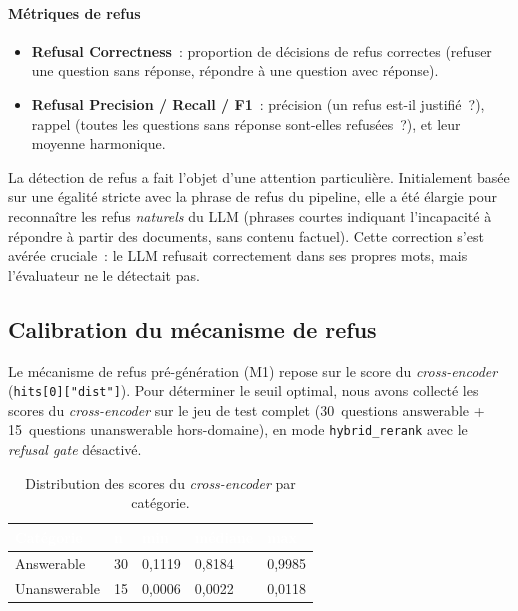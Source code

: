 \documentclass[11pt,a4paper]{article}
\begin{document}
\paragraph{Métriques de refus}

\begin{itemize}
  \item \textbf{Refusal Correctness}~: proportion de décisions de refus correctes (refuser une question sans réponse, répondre à une question avec réponse).
  \item \textbf{Refusal Precision / Recall / F1}~: précision (un refus est-il justifié~?), rappel (toutes les questions sans réponse sont-elles refusées~?), et leur moyenne harmonique.
\end{itemize}

La détection de refus a fait l'objet d'une attention particulière. Initialement basée sur une égalité stricte avec la phrase de refus du pipeline, elle a été élargie pour reconnaître les refus \textit{naturels} du LLM (phrases courtes indiquant l'incapacité à répondre à partir des documents, sans contenu factuel). Cette correction s'est avérée cruciale~: le LLM refusait correctement dans ses propres mots, mais l'évaluateur ne le détectait pas.

\subsection{Calibration du mécanisme de refus}
\label{sec:calibration}

Le mécanisme de refus pré-génération (M1) repose sur le score du \textit{cross-encoder} (\texttt{hits[0]["dist"]}). Pour déterminer le seuil optimal, nous avons collecté les scores du \textit{cross-encoder} sur le jeu de test complet (30~questions answerable + 15~questions unanswerable hors-domaine), en mode \texttt{hybrid\_rerank} avec le \textit{refusal gate} désactivé.

\begin{table}[H]
\centering
\small
\begin{tabularx}{\linewidth}{L{3.5cm} C{1.5cm} C{2cm} C{2cm} C{2cm}}
\toprule
{}
\textcolor{white}{\textbf{Catégorie}} & \textcolor{white}{\textbf{n}} & \textcolor{white}{\textbf{min}} & \textcolor{white}{\textbf{médiane}} & \textcolor{white}{\textbf{max}} \\
\midrule
Answerable   & 30 & 0,1119 & 0,8184 & 0,9985 \\
Unanswerable & 15 & 0,0006 & 0,0022 & 0,0118 \\
\bottomrule
\end{tabularx}
\caption{Distribution des scores du \textit{cross-encoder} par catégorie.}
\label{tab:calibration-distrib}
\end{table}
\end{document}
